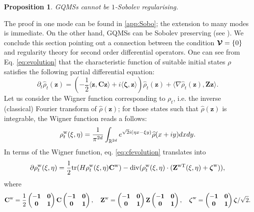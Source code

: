 \documentclass[preprint]{elsarticle}
\newtheorem{prop}[defi]{Proposition}
\theoremstyle{definition}
\def\RR{\mathbb{R}}
\def\tr{{\rm tr}}
\begin{document}
\begin{prop} \label{prop:Sobolev}
    GQMSs cannot be $1$-Sobolev regularising.
\end{prop}

The proof in one mode can be found in  \ref{app:Sobo}; the extension to many modes is immediate. On the other hand, GQMSs can be Sobolev preserving (see \cite{GMR24}). We conclude this section pointing out a connection between the condition $\boldsymbol{{\cal V}}=\{0\}$ and regularity theory for second order differential operators. One can see from Eq. \eqref{eq:evolution} that the characteristic function of suitable initial states $\rho$ satisfies the following partial differential equation:
\begin{equation} \label{eq:cfevolution}
\partial_t\widehat{\rho}_t(\mathbf{z})=\left ( -\frac{1}{2} \langle \mathbf{z},\mathbf{C}\mathbf{z}\rangle +i \langle \boldsymbol{\zeta}, \mathbf{z} \rangle \right )\widehat{\rho}_t(\mathbf{z})+\langle \nabla\widehat{\rho}_t(\mathbf{z}),\mathbf{Z}\mathbf{z} \rangle.
\end{equation}
Let us consider the Wigner function corresponding to $\rho_t$, i.e. the inverse (classical) Fourier transform of $\widehat{\rho}(\mathbf{z})$; for those states such that $\hat{\rho}(\mathbf{z})$ is integrable, the Wigner function reads a follows:
$$\rho^{\rm w}_t(\xi,\eta)=\frac{1}{\pi^{2d}}\int_{\RR^{2d}}e^{\sqrt{2}i(\eta x -\xi y)}\widehat{\rho}(x+iy)dxdy.$$
In terms of the Wigner function, eq. \eqref{eq:cfevolution} translates into
\begin{equation}\label{eq:wevo}
    \partial\rho^{\rm w}_t(\xi,\eta)=\frac{1}{2}\tr(H\rho^{\rm w}_t(\xi,\eta)\mathbf{C}^{\rm w}) -{\rm div}( \rho^{\rm w}_t(\xi,\eta)\cdot (\mathbf{Z}^{\rm w T}(\xi,\eta)+\boldsymbol{\zeta}^{\rm w})),
\end{equation}
where
$$\mathbf{C}^{\rm w}=\frac{1}{2}\begin{pmatrix} -{\bf1 }& \mathbf{0}\\
{\bf 0} & {\bf 1}\end{pmatrix}\mathbf{C}\begin{pmatrix} -{\bf1 }& \mathbf{0}\\
{\bf 0} & {\bf 1}\end{pmatrix}, \quad \mathbf{Z}^{\rm w}=\begin{pmatrix} -{\bf1 }& \mathbf{0}\\
{\bf 0} & {\bf 1}\end{pmatrix}\mathbf{Z}\begin{pmatrix} -{\bf1 }& \mathbf{0}\\
{\bf 0} & {\bf 1}\end{pmatrix}, \quad \boldsymbol{\zeta}^{\rm w}=\begin{pmatrix} -{\bf1 }& \mathbf{0}\\
{\bf 0} & {\bf 1}\end{pmatrix}\boldsymbol{\zeta}/\sqrt{2}.$$
\end{document}
